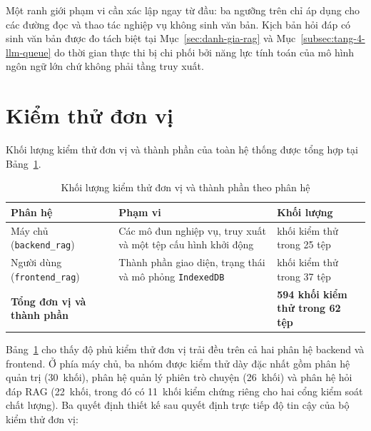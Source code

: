 Một ranh giới phạm vi cần xác lập ngay từ đầu: ba ngưỡng trên chỉ áp dụng cho các đường đọc và thao tác nghiệp vụ không sinh văn bản. Kịch bản hỏi đáp có sinh văn bản được đo tách biệt tại Mục~\ref{sec:danh-gia-rag} và Mục~\ref{subsec:tang-4-llm-queue} do thời gian thực thi bị chi phối bởi năng lực tính toán của mô hình ngôn ngữ lớn chứ không phải tầng truy xuất.

\section{Kiểm thử đơn vị}
\label{sec:unit-testing}

Khối lượng kiểm thử đơn vị và thành phần của toàn hệ thống được tổng hợp tại Bảng~\ref{tab:khoi-luong-unit-test}.

\begin{table}[htbp]
\centering
\caption{Khối lượng kiểm thử đơn vị và thành phần theo phân hệ}
\label{tab:khoi-luong-unit-test}
\small
\begin{tabularx}{\textwidth}{
  >{\raggedright\arraybackslash}p{4.0cm}
  >{\raggedright\arraybackslash}X
  >{\raggedleft\arraybackslash}p{4.2cm}
}
\toprule
\textbf{Phân hệ} & \textbf{Phạm vi} & \textbf{Khối lượng} \\
\midrule
Máy chủ (\texttt{backend\_rag}) & Các mô đun nghiệp vụ, truy xuất và một tệp cấu hình khởi động & 267 khối kiểm thử trong 25 tệp \\
\midrule
Người dùng (\texttt{frontend\_rag}) & Thành phần giao diện, trạng thái và mô phỏng \texttt{IndexedDB} & 327 khối kiểm thử trong 37 tệp \\
\midrule
\textbf{Tổng đơn vị và thành phần} & & \textbf{594 khối kiểm thử trong 62 tệp} \\
\bottomrule
\end{tabularx}
\end{table}

Bảng~\ref{tab:khoi-luong-unit-test} cho thấy độ phủ kiểm thử đơn vị trải đều trên cả hai phân hệ backend và frontend. Ở phía máy chủ, ba nhóm được kiểm thử dày đặc nhất gồm phân hệ quản trị (30~khối), phân hệ quản lý phiên trò chuyện (26~khối) và phân hệ hỏi đáp RAG (22~khối, trong đó có 11~khối kiểm chứng riêng cho hai cổng kiểm soát chất lượng). Ba quyết định thiết kế sau quyết định trực tiếp độ tin cậy của bộ kiểm thử đơn vị:

